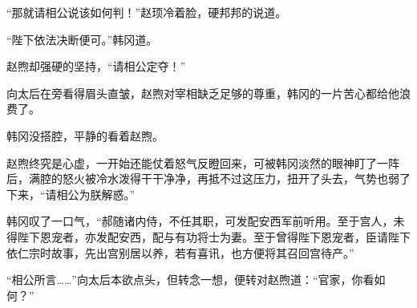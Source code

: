 “那就请相公说该如何判！”赵顼冷着脸，硬邦邦的说道。

“陛下依法决断便可。”韩冈道。

赵煦却强硬的坚持，“请相公定夺！”

向太后在旁看得眉头直皱，赵煦对宰相缺乏足够的尊重，韩冈的一片苦心都给他浪费了。

韩冈没搭腔，平静的看着赵煦。

赵煦终究是心虚，一开始还能仗着怒气反瞪回来，可被韩冈淡然的眼神盯了一阵后，满腔的怒火被冷水泼得干干净净，再抵不过这压力，扭开了头去，气势也弱了下来，“请相公为朕解惑。”

韩冈叹了一口气，“郝随诸内侍，不任其职，可发配安西军前听用。至于宫人，未得陛下恩宠者，亦发配安西，配与有功将士为妻。至于曾得陛下恩宠者，臣请陛下依仁宗时故事，先出宫别居以养，若有喜讯，也方便将其召回宫待产。”

“相公所言……”向太后本欲点头，但转念一想，便转对赵煦道：“官家，你看如何？”
